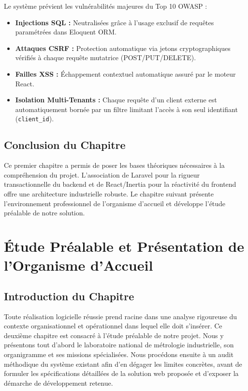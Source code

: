 \documentclass{bts-report}
\begin{document}
Le syst\`eme pr\'evient les vuln\'erabilit\'es majeures du Top 10 OWASP :
\begin{itemize}
  \item \textbf{Injections SQL :} Neutralis\'ees gr\^ace \`a l'usage exclusif de requ\^etes param\'etr\'ees dans Eloquent ORM.
  \item \textbf{Attaques CSRF :} Protection automatique via jetons cryptographiques v\'erifi\'es \`a chaque requ\^ete mutatrice (POST/PUT/DELETE).
  \item \textbf{Failles XSS :} \'Echappement contextuel automatique assur\'e par le moteur React.
  \item \textbf{Isolation Multi-Tenants :} Chaque requ\^ete d'un client externe est automatiquement born\'ee par un filtre limitant l'acc\`es \`a son seul identifiant (\texttt{client\_id}).
\end{itemize}

\section*{Conclusion du Chapitre}
Ce premier chapitre a permis de poser les bases th\'eoriques n\'ecessaires \`a la compr\'ehension du projet. L'association de Laravel pour la rigueur transactionnelle du backend et de React/Inertia pour la r\'eactivit\'e du frontend offre une architecture industrielle robuste. Le chapitre suivant pr\'esente l'environnement professionnel de l'organisme d'accueil et d\'eveloppe l'\'etude pr\'ealable de notre solution.


\chapter{\'Etude Pr\'ealable et Pr\'esentation de l'Organisme d'Accueil}

\section*{Introduction du Chapitre}
Toute r\'ealisation logicielle r\'eussie prend racine dans une analyse rigoureuse du contexte organisationnel et op\'erationnel dans lequel elle doit s'ins\'erer. Ce deuxi\`eme chapitre est consacr\'e \`a l'\'etude pr\'ealable de notre projet. Nous y pr\'esentons tout d'abord le laboratoire national de m\'etrologie industrielle, son organigramme et ses missions sp\'ecialis\'ees. Nous proc\'edons ensuite \`a un audit m\'ethodique du syst\`eme existant afin d'en d\'egager les limites concr\`etes, avant de formuler les sp\'ecifications d\'etaill\'ees de la solution web propos\'ee et d'exposer la d\'emarche de d\'eveloppement retenue.
\end{document}
